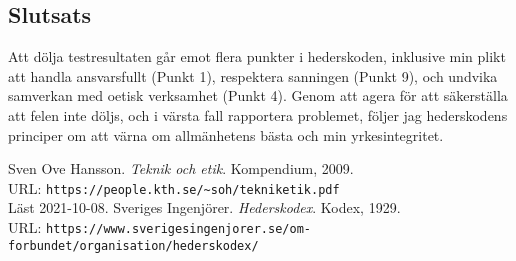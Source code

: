\documentclass[a4paper,12pt]{article}
\begin{document}
\subsection*{Slutsats}
Att dölja testresultaten går emot flera punkter i hederskoden, inklusive min
plikt att handla ansvarsfullt (Punkt 1), respektera sanningen (Punkt 9), och
undvika samverkan med oetisk verksamhet (Punkt 4). Genom att agera för att
säkerställa att felen inte döljs, och i värsta fall rapportera problemet,
följer jag hederskodens principer om att värna om allmänhetens bästa och min
yrkesintegritet.
%
\begin{thebibliography}{99}
     Sven Ove Hansson. \emph{Teknik och etik}.  Kompendium, 2009.
    \\
    URL: \verb|https://people.kth.se/~soh/tekniketik.pdf| \\
    Läst 2021-10-08.
     Sveriges Ingenjörer. \emph{Hederskodex}.  Kodex, 1929.  \\
    URL:
    \verb|https://www.sverigesingenjorer.se/om-forbundet/organisation/hederskodex/|
\end{thebibliography}
%
\end{document}
